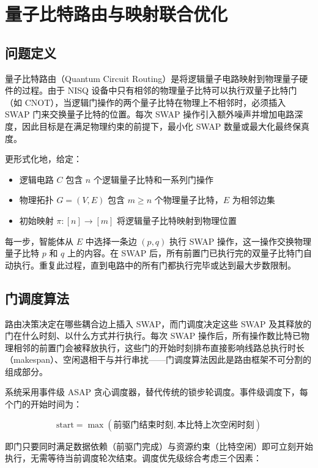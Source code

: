 \newpage
\section{量子比特路由与映射联合优化}
\label{sec:routing-mapping}

\subsection{问题定义}

量子比特路由（Quantum Circuit Routing）是将逻辑量子电路映射到物理量子硬件的过程。由于 NISQ 设备中只有相邻的物理量子比特可以执行双量子比特门（如 CNOT），当逻辑门操作的两个量子比特在物理上不相邻时，必须插入 SWAP 门来交换量子比特的位置。每次 SWAP 操作引入额外噪声并增加电路深度，因此目标是在满足物理约束的前提下，最小化 SWAP 数量或最大化最终保真度。

更形式化地，给定：
\begin{itemize}
  \item 逻辑电路 $C$ 包含 $n$ 个逻辑量子比特和一系列门操作
  \item 物理拓扑 $G = (V, E)$ 包含 $m \geq n$ 个物理量子比特，$E$ 为相邻边集
  \item 初始映射 $\pi: [n] \to [m]$ 将逻辑量子比特映射到物理位置
\end{itemize}

每一步，智能体从 $E$ 中选择一条边 $(p,q)$ 执行 SWAP 操作，这一操作交换物理量子比特 $p$ 和 $q$ 上的内容。在 SWAP 后，所有前置门已执行完的双量子比特门自动执行。重复此过程，直到电路中的所有门都执行完毕或达到最大步数限制。

\subsection{门调度算法}
\label{sec:gate-scheduling}

路由决策决定在哪些耦合边上插入 SWAP，而门调度决定这些 SWAP 及其释放的门在什么时刻、以什么方式并行执行。每次 SWAP 操作后，所有操作数比特已物理相邻的前置门会被释放执行，这些门的开始时刻排布直接影响线路总执行时长（makespan）、空闲退相干与并行串扰——门调度算法因此是路由框架不可分割的组成部分。

系统采用事件级 ASAP 贪心调度器，替代传统的锁步轮调度。事件级调度下，每个门的开始时间为：

\begin{equation}
\text{start} = \max(\text{前驱门结束时刻}, \text{本比特上次空闲时刻})
\end{equation}

即门只要同时满足数据依赖（前驱门完成）与资源约束（比特空闲）即可立刻开始执行，无需等待当前调度轮次结束。调度优先级综合考虑三个因素：

